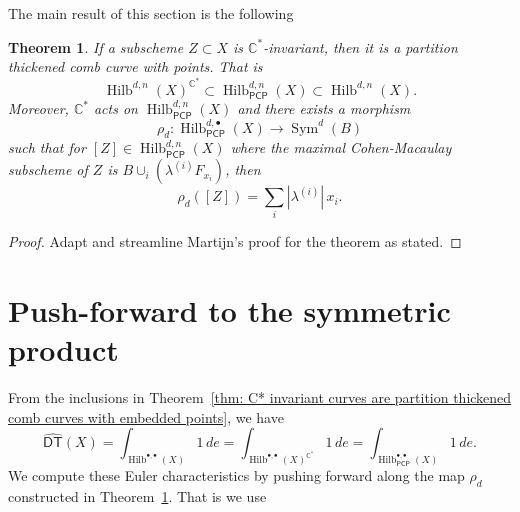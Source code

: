 \documentclass{amsart}
\newtheorem{theorem}{Theorem}%
\theoremstyle{definition}
\newcommand{\CC} {\mathbb{C}}          %
\newcommand{\Sym}{\operatorname{Sym}}
\newcommand{\Hilb}{\operatorname{Hilb}}
\newcommand{\DT}{\mathsf{DT}}
\newcommand{\DThat}{\widehat{\DT}}
\newcommand{\PCP}{\mathsf{PCP}}
\begin{document}
The main result of this section is the following
\begin{theorem}\label{thm: C* invariant curves are partition thickened
comb curves with embedded points}
If a subscheme $Z\subset X$ is $\CC^{*}$-invariant, then it is a
partition thickened comb curve with points. That is
\[
\Hilb^{d,n}(X)^{\CC^{*}}\subset \Hilb^{d,n}_{\PCP }(X)\subset \Hilb^{d,n}(X).
\]
Moreover, $\CC^{*}$ acts
on $\Hilb^{d,n}_{\PCP}(X)$ and there
exists a morphism
\begin{equation}\label{eqn: rho : HilbPCP-->Sym(B)}
\rho_{d}: \Hilb^{d,\bullet}_{\PCP }(X) \to  \Sym^{d}(B)
\end{equation}
such that for $[Z]\in \Hilb_{\PCP}^{d,n}(X)$ where the maximal
Cohen-Macaulay subscheme of $Z$ is $B\cup_{i}\left(\lambda^{(i)}F_{x_{i}}
\right)$, then
\[
\rho_{d}([Z]) = \sum_{i} |\lambda^{(i)}|\,x_{i}. 
\]
\end{theorem}

\begin{proof}
Adapt and streamline Martijn's proof for the theorem as
stated.
\end{proof}



\section{Push-forward to the symmetric product} \label{sym}

From the inclusions in Theorem~\ref{thm: C* invariant curves are
partition thickened comb curves with embedded points}, we have
\[
\DThat (X) = \int_{\Hilb^{\bullet ,\bullet}(X)} 1 \, de  =
\int_{\Hilb^{\bullet ,\bullet}(X)^{\CC^{*}}} 1 \, de  = \int_{\Hilb^{\bullet
,\bullet}_{\PCP }(X)} 1 \, de  .
\]
We compute these Euler characteristics by pushing forward along the
map $\rho_{d}$ constructed in Theorem~\ref{thm: C* invariant curves are partition thickened
comb curves with embedded points}. That is we use
\end{document}
